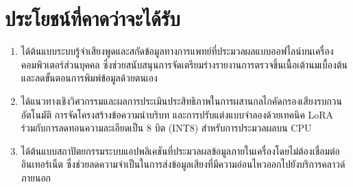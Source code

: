 \section{ประโยชน์ที่คาดว่าจะได้รับ}

\begin{enumerate}[label=(\arabic*), leftmargin=*, align=left]
    \item ได้ต้นแบบระบบรู้จำเสียงพูดและสกัดข้อมูลทางการแพทย์ที่ประมวลผลแบบออฟไลน์บนเครื่องคอมพิวเตอร์ส่วนบุคคล ซึ่งช่วยสนับสนุนการจัดเตรียมร่างรายงานการตรวจชิ้นเนื้อเต้านมเบื้องต้นและลดขั้นตอนการพิมพ์ข้อมูลด้วยตนเอง
    \item ได้แนวทางเชิงวิศวกรรมและผลการประเมินประสิทธิภาพในการผสานกลไกคัดกรองเสียงรบกวนอัตโนมัติ การจัดโครงสร้างข้อความนำบริบท และการปรับแต่งแบบจำลองด้วยเทคนิค LoRA ร่วมกับการลดทอนความละเอียดเป็น 8 บิต (INT8) สำหรับการประมวลผลบน CPU
    \item ได้ต้นแบบสถาปัตยกรรมระบบแอปพลิเคชันที่ประมวลผลข้อมูลภายในเครื่องโดยไม่ต้องเชื่อมต่ออินเทอร์เน็ต ซึ่งช่วยลดความจำเป็นในการส่งข้อมูลเสียงที่มีความอ่อนไหวออกไปยังบริการคลาวด์ภายนอก
\end{enumerate}
